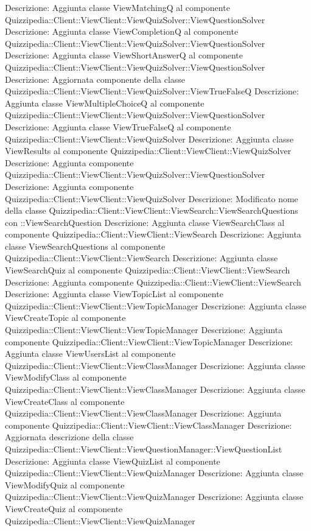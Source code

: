 Descrizione: Aggiunta classe ViewMatchingQ al componente Quizzipedia::Client::ViewClient::ViewQuizSolver::ViewQuestionSolver 
Descrizione: Aggiunta classe ViewCompletionQ al componente Quizzipedia::Client::ViewClient::ViewQuizSolver::ViewQuestionSolver 
Descrizione: Aggiunta classe ViewShortAnswerQ al componente Quizzipedia::Client::ViewClient::ViewQuizSolver::ViewQuestionSolver 
Descrizione: Aggiornata componente della classe Quizzipedia::Client::ViewClient::ViewQuizSolver::ViewTrueFalseQ 
Descrizione: Aggiunta classe ViewMultipleChoiceQ al componente Quizzipedia::Client::ViewClient::ViewQuizSolver::ViewQuestionSolver 
Descrizione: Aggiunta classe ViewTrueFalseQ al componente Quizzipedia::Client::ViewClient::ViewQuizSolver 
Descrizione: Aggiunta classe ViewResults al componente Quizzipedia::Client::ViewClient::ViewQuizSolver 
Descrizione: Aggiunta componente Quizzipedia::Client::ViewClient::ViewQuizSolver::ViewQuestionSolver 
Descrizione: Aggiunta componente Quizzipedia::Client::ViewClient::ViewQuizSolver 
Descrizione: Modificato nome della classe Quizzipedia::Client::ViewClient::ViewSearch::ViewSearchQuestions con ::ViewSearchQuestion 
Descrizione: Aggiunta classe ViewSearchClass al componente Quizzipedia::Client::ViewClient::ViewSearch 
Descrizione: Aggiunta classe ViewSearchQuestions al componente Quizzipedia::Client::ViewClient::ViewSearch 
Descrizione: Aggiunta classe ViewSearchQuiz al componente Quizzipedia::Client::ViewClient::ViewSearch 
Descrizione: Aggiunta componente Quizzipedia::Client::ViewClient::ViewSearch 
Descrizione: Aggiunta classe ViewTopicList al componente Quizzipedia::Client::ViewClient::ViewTopicManager 
Descrizione: Aggiunta classe ViewCreateTopic al componente Quizzipedia::Client::ViewClient::ViewTopicManager 
Descrizione: Aggiunta componente Quizzipedia::Client::ViewClient::ViewTopicManager 
Descrizione: Aggiunta classe ViewUsersList al componente Quizzipedia::Client::ViewClient::ViewClassManager 
Descrizione: Aggiunta classe ViewModifyClass al componente Quizzipedia::Client::ViewClient::ViewClassManager 
Descrizione: Aggiunta classe ViewCreateClass al componente Quizzipedia::Client::ViewClient::ViewClassManager 
Descrizione: Aggiunta componente Quizzipedia::Client::ViewClient::ViewClassManager 
Descrizione: Aggiornata descrizione della classe Quizzipedia::Client::ViewClient::ViewQuestionManager::ViewQuestionList 
Descrizione: Aggiunta classe ViewQuizList al componente Quizzipedia::Client::ViewClient::ViewQuizManager 
Descrizione: Aggiunta classe ViewModifyQuiz al componente Quizzipedia::Client::ViewClient::ViewQuizManager 
Descrizione: Aggiunta classe ViewCreateQuiz al componente Quizzipedia::Client::ViewClient::ViewQuizManager 
